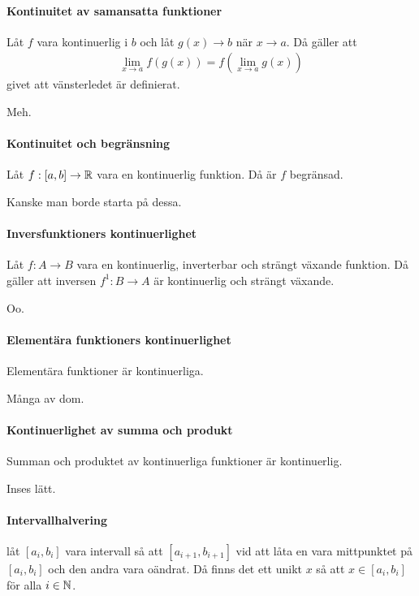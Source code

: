 \paragraph{Kontinuitet av samansatta funktioner}
Låt $f$ vara kontinuerlig i $b$ och låt $g(x)\to b$ när $x\to a$. Då gäller att
\begin{align*}
	\lim\limits_{x\to a}f(g(x)) = f(\lim\limits_{x\to a}g(x))
\end{align*}
givet att vänsterledet är definierat.

\proof
Meh.

\paragraph{Kontinuitet och begränsning}
Låt $f: [a,b]\to\mathbb{R}$ vara en kontinuerlig funktion. Då är $f$ begränsad.

\proof
Kanske man borde starta på dessa.

\paragraph{Inversfunktioners kontinuerlighet}
Låt $f: A\to B$ vara en kontinuerlig, inverterbar och strängt växande funktion. Då gäller att inversen $f^{1}: B\to A$ är kontinuerlig och strängt växande.

\proof
Oo.

\paragraph{Elementära funktioners kontinuerlighet}
Elementära funktioner är kontinuerliga.

\proof
Många av dom.

\paragraph{Kontinuerlighet av summa och produkt}
Summan och produktet av kontinuerliga funktioner är kontinuerlig.

\proof
Inses lätt.

\paragraph{Intervallhalvering}
låt $[a_i, b_i]$ vara intervall så att $[a_{i + 1}, b_{i + 1}]$ vid att låta en vara mittpunktet på $[a_i, b_i]$ och den andra vara oändrat. Då finns det ett unikt $x$ så att $x\in [a_i, b_i]$ för alla $i\in\mathbb{N}$.

